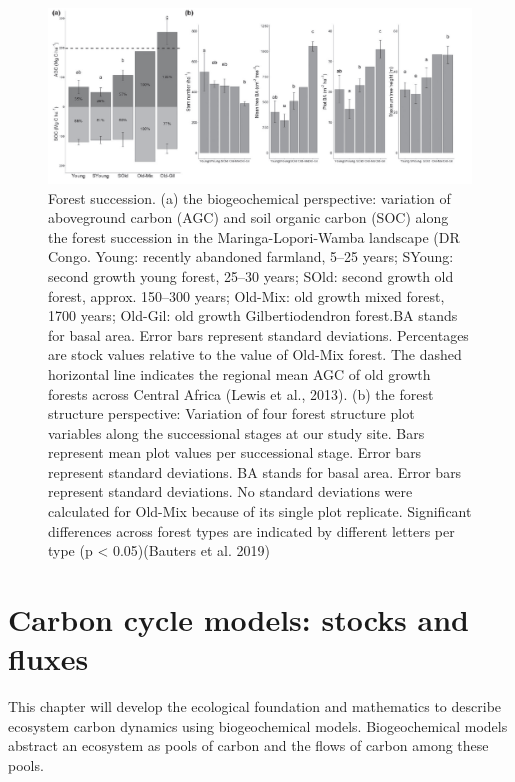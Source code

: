 \documentclass[
  12pt,
  oneside]{book}
\begin{document}
\begin{figure}

{\centering \includegraphics[width=0.8\linewidth]{figures/chap5/f51_bauters} 

}

\caption{Forest succession. (a) the biogeochemical perspective: variation of aboveground carbon (AGC) and soil organic carbon (SOC) along the forest succession in the Maringa-Lopori-Wamba landscape (DR Congo. Young: recently abandoned farmland, 5–25 years; SYoung: second growth young forest, 25–30 years; SOld: second growth old forest, approx. 150–300 years; Old-Mix: old growth mixed forest, 1700 years; Old-Gil: old growth Gilbertiodendron forest.BA stands for basal area. Error bars represent standard deviations. Percentages are stock values relative to the value of Old-Mix forest. The dashed horizontal line indicates the regional mean AGC of old growth forests across Central Africa (Lewis et al., 2013). (b) the forest structure perspective: Variation of four forest structure plot variables along the successional stages at our study site. Bars represent mean plot values per successional stage. Error bars represent standard deviations. BA stands for basal area. Error bars represent standard deviations. No standard deviations were calculated for Old-Mix because of its single plot replicate. Significant differences across forest types are indicated by different letters per type (p < 0.05)(Bauters et al. 2019)}\label{fig:f51}
\end{figure}

\hypertarget{carbon-cycle-models-stocks-and-fluxes}{%
\section{Carbon cycle models: stocks and fluxes}\label{carbon-cycle-models-stocks-and-fluxes}}

This chapter will develop the ecological foundation and mathematics to describe ecosystem carbon dynamics using biogeochemical models.
Biogeochemical models abstract an ecosystem as pools of carbon and the flows of carbon among these pools.
\end{document}
